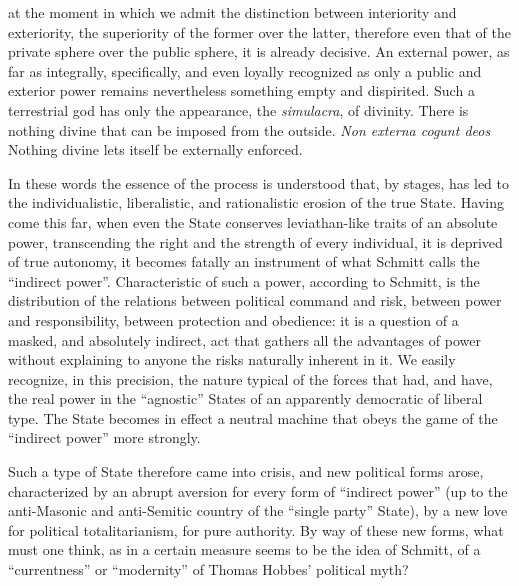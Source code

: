 \begin{quotex}
at the moment in which we admit the distinction between interiority and exteriority, the superiority of the former over the latter, therefore even that of the private sphere over the public sphere, it is already decisive. An external power, as far as integrally, specifically, and even loyally recognized as only a public and exterior power remains nevertheless something empty and dispirited. Such a terrestrial god has only the appearance, the \emph{simulacra}, of divinity. There is nothing divine that can be imposed from the outside. \emph{Non externa cogunt deos} Nothing divine lets itself be externally enforced.
\end{quotex}


In these words the essence of the process is understood that, by stages, has led to the individualistic, liberalistic, and rationalistic erosion of the true State. Having come this far, when even the State conserves leviathan-like traits of an absolute power, transcending the right and the strength of every individual, it is deprived of true autonomy, it becomes fatally an instrument of what Schmitt calls the ``indirect power''. Characteristic of such a power, according to Schmitt, is the distribution of the relations between political command and risk, between power and responsibility, between protection and obedience: it is a question of a masked, and absolutely indirect, act that gathers all the advantages of power without explaining to anyone the risks naturally inherent in it. We easily recognize, in this precision, the nature typical of the forces that had, and have, the real power in the ``agnostic'' States of an apparently democratic of liberal type. The State becomes in effect a neutral machine that obeys the game of the ``indirect power'' more strongly.

Such a type of State therefore came into crisis, and new political forms arose, characterized by an abrupt aversion for every form of ``indirect power'' (up to the anti-Masonic and anti-Semitic country of the ``single party'' State), by a new love for political totalitarianism, for pure authority. By way of these new forms, what must one think, as in a certain measure seems to be the idea of Schmitt, of a ``currentness'' or ``modernity'' of Thomas Hobbes' political myth?


